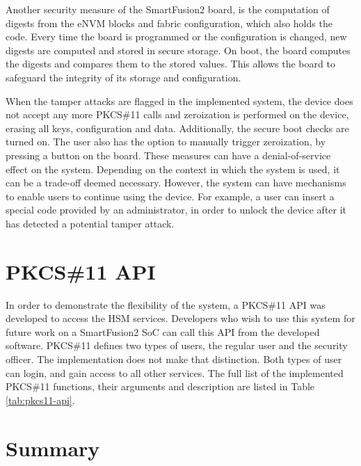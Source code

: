 Another security measure of the SmartFusion2 board, is the computation of digests from the eNVM blocks and fabric configuration, which also holds the code. Every time the board is programmed or the configuration is changed, new digests are computed and stored in secure storage. On boot, the board computes the digests and compares them to the stored values. This allows the board to safeguard the integrity of its storage and configuration.

When the tamper attacks are flagged in the implemented system, the device does not accept any more PKCS\#11 calls and zeroization is performed on the device, erasing all keys, configuration and data. Additionally, the secure boot checks are turned on.
The user also has the option to manually trigger zeroization, by pressing a button on the board.
These measures can have a denial-of-service effect on the system. Depending on the context in which the system is used, it can be a trade-off deemed necessary. However, the system can have mechanisms to enable users to continue using the device. For example, a user can insert a special code provided by an administrator, in order to unlock the device after it has detected a potential tamper attack.

\section{PKCS\#11 API}\label{chap:implementation:app:pkcs}

In order to demonstrate the flexibility of the system, a PKCS\#11 API was developed to access the HSM services. Developers who wish to use this system for future work on a SmartFusion2 SoC can call this API from the developed software.
PKCS\#11 defines two types of users, the regular user and the security officer. The implementation does not make that distinction. Both types of user can login, and gain access to all other services.
The full list of the implemented PKCS\#11 functions, their arguments and description are listed in Table \ref{tab:pkcs11-api}.

\section*{Summary}\label{chap:implementation:summary}

